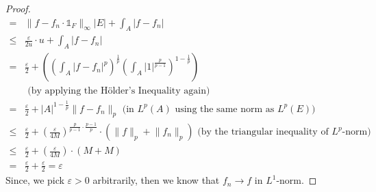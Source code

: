 \begin{answer}
\begin{proof}
\begin{equation}
\begin{aligned}
                = &\lVert f - f_n \cdot \mathbb{1}_F \rVert_{\infty} \lvert E \rvert + \int_A \lvert f - f_n\rvert\\
                \leq &\tfrac{\varepsilon}{2u} \cdot u + \int_A \lvert f - f_n\rvert\\
                = &\tfrac{\varepsilon}{2} +  \left(\left(\int_A \lvert f - f_n \rvert^p\right)^{\frac{1}{p}}\left(\int_A \lvert 1 \rvert^{\frac{p}{p-1}}\right)^{1-\frac{1}{p}}\right)\\
                &\text{ (by applying the Hölder's Inequality again)}\\
                = &\tfrac{\varepsilon}{2} + \lvert A \rvert^{1-\frac{1}{p}}\lVert f - f_n \rVert_p \text{ (in $L^p(A)$ using the same norm as $L^p(E)$)}\\
                \leq &\tfrac{\varepsilon}{2} + \left(\tfrac{\varepsilon}{4M}\right)^{\frac{p}{p-1}\cdot\frac{p-1}{p}}\cdot(\lVert f \rVert_p + \lVert f_n \rVert_p) \text{ (by the triangular inequality of $L^p$-norm)}\\
                \leq &\tfrac{\varepsilon}{2} + \left(\tfrac{\varepsilon}{4M}\right)\cdot(M+M)\\
                = &\tfrac{\varepsilon}{2} + \tfrac{\varepsilon}{2} = \varepsilon
            \end{aligned}
        \end{equation}
        Since, we pick $\varepsilon > 0$ arbitrarily, then we know that $f_n \to f$ in $L^1$-norm.
    \end{proof}
\end{answer}